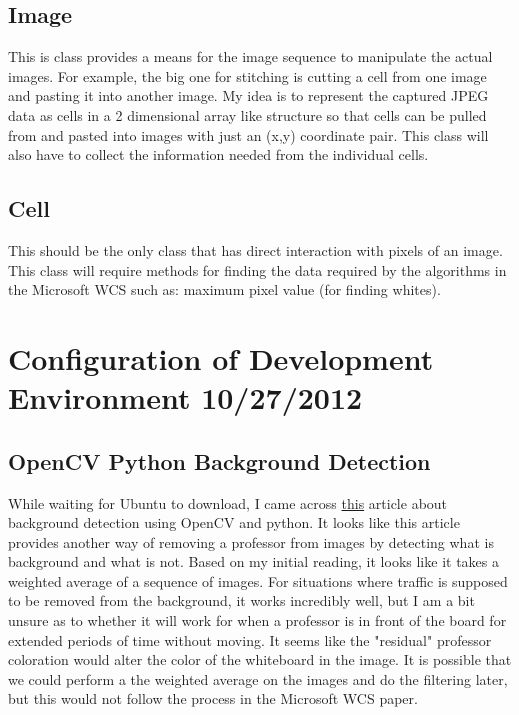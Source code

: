 \documentclass[]{article}
\begin{document}
		\subsection{Image}
			This is class provides a means for the image sequence to manipulate the actual images. For example, the big one for stitching is cutting a cell from one image and pasting it into another image. My idea is to represent the captured JPEG data as cells in a 2 dimensional array like structure so that cells can be pulled from and pasted into images with just an (x,y) coordinate pair. This class will also have to collect the information needed from the individual cells.
			
		\subsection{Cell}
			This should be the only class that has direct interaction with pixels of an image. This class will require methods for finding the data required by the algorithms in the Microsoft WCS such as: maximum pixel value (for finding whites).
		 
	
	
	\section{Configuration of Development Environment 10/27/2012}
	
		\subsection{OpenCV Python Background Detection}
			While waiting for Ubuntu to download, I came across \href{http://opencvpython.blogspot.com/}{this} article about background detection using OpenCV and python. It looks like this article provides another way of removing a professor from images by detecting what is background and what is not. Based on my initial reading, it looks like it takes a weighted average of a sequence of images. For situations where traffic is supposed to be removed from the background, it works incredibly well, but I am a bit unsure as to whether it will work for when a professor is in front of the board for extended periods of time without moving. It seems like the "residual" professor coloration would alter the color of the whiteboard in the image. It is possible that we could perform a the weighted average on the images and do the filtering later, but this would not follow the process in the Microsoft WCS paper. 
	
\end{document}
